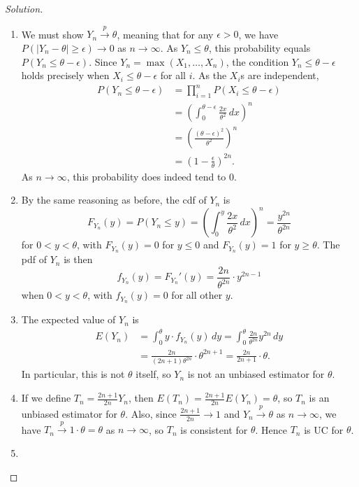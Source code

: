 \documentclass{article}
\begin{document}
\begin{proof}[Solution]
\begin{enumerate}[label=(\alph*)]
\item We must show $Y_n\stackrel{p}{\to}\theta$, meaning that for any $\epsilon > 0$, we have $P(\lvert Y_n - \theta\rvert\geq\epsilon)\to 0$ as $n\to\infty$. As $Y_n\leq\theta$, this probability equals $P(Y_n\leq\theta - \epsilon)$. Since $Y_n = \max(X_1, \ldots, X_n)$, the condition $Y_n\leq\theta - \epsilon$ holds precisely when $X_i\leq\theta - \epsilon$ for all $i$. As the $X_i$s are independent,
\begin{align*}
P(Y_n\leq\theta - \epsilon) &= \prod_{i = 1}^n P(X_i\leq\theta - \epsilon) \\
&= \left(\int_0^{\theta - \epsilon}\frac{2x}{\theta^2}\,dx\right)^n \\
&= \left(\frac{(\theta - \epsilon)^2}{\theta^2}\right)^n \\
&= \left(1 - \frac{\epsilon}{\theta}\right)^{2n}.
\end{align*}
As $n\to\infty$, this probability does indeed tend to $0$.
\item By the same reasoning as before, the cdf of $Y_n$ is
\begin{equation*}
F_{Y_n}(y) = P(Y_n\leq y) = \left(\int_0^y\frac{2x}{\theta^2}\,dx\right)^n = \frac{y^{2n}}{\theta^{2n}}
\end{equation*}
for $0 < y < \theta$, with $F_{Y_n}(y) = 0$ for $y\leq 0$ and $F_{Y_n}(y) = 1$ for $y\geq \theta$. The pdf of $Y_n$ is then
\begin{equation*}
f_{Y_n}(y) = F_{Y_n}'(y) = \frac{2n}{\theta^{2n}}\cdot y^{2n - 1}
\end{equation*}
when $0 < y < \theta$, with $f_{Y_n}(y) = 0$ for all other $y$.
\item The expected value of $Y_n$ is
\begin{align*}
E(Y_n) &= \int_0^{\theta} y\cdot f_{Y_n}(y)\,dy = \int_0^{\theta} \frac{2n}{\theta^{2n}} y^{2n}\,dy \\
&= \frac{2n}{(2n + 1)\theta^{2n}}\cdot\theta^{2n + 1} = \frac{2n}{2n + 1}\cdot\theta.
\end{align*}
In particular, this is not $\theta$ itself, so $Y_n$ is not an unbiased estimator for $\theta$.
\item If we define $T_n = \frac{2n + 1}{2n}Y_n$, then $E(T_n) = \frac{2n + 1}{2n}E(Y_n) = \theta$, so $T_n$ is an unbiased estimator for $\theta$. Also, since $\frac{2n + 1}{2n}\to 1$ and $Y_n\stackrel{p}{\to}\theta$ as $n\to\infty$, we have $T_n\stackrel{p}{\to} 1\cdot\theta = \theta$ as $n\to\infty$, so $T_n$ is consistent for $\theta$. Hence $T_n$ is UC for $\theta$.
\item 
\end{enumerate}
\end{proof}
\end{document}
